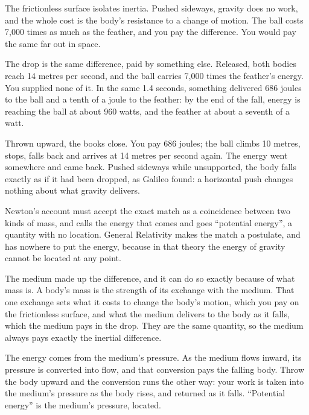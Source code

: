 \documentclass[11pt,a4paper]{article}
\begin{document}
The frictionless surface isolates inertia. Pushed sideways, gravity does no work, and the whole cost is the body's resistance to a change of motion. The ball costs 7{,}000 times as much as the feather, and you pay the difference. You would pay the same far out in space.

The drop is the same difference, paid by something else. Released, both bodies reach 14 metres per second, and the ball carries 7{,}000 times the feather's energy. You supplied none of it. In the same 1.4 seconds, something delivered 686 joules to the ball and a tenth of a joule to the feather: by the end of the fall, energy is reaching the ball at about 960 watts, and the feather at about a seventh of a watt. 

Thrown upward, the books close. You pay 686 joules; the ball climbs 10 metres, stops, falls back and arrives at 14 metres per second again. The energy went somewhere and came back. Pushed sideways while unsupported, the body falls exactly as if it had been dropped, as Galileo found: a horizontal push changes nothing about what gravity delivers.

Newton's account must accept the exact match as a coincidence between two kinds of mass, and calls the energy that comes and goes ``potential energy'', a quantity with no location. General Relativity makes the match a postulate, and has nowhere to put the energy, because in that theory the energy of gravity cannot be located at any point. 

\begin{hypbar}
The medium made up the difference, and it can do so exactly because of what mass is. A body's mass is the strength of its exchange with the medium. That one exchange sets what it costs to change the body's motion, which you pay on the frictionless surface, and what the medium delivers to the body as it falls, which the medium pays in the drop. They are the same quantity, so the medium always pays exactly the inertial difference.

The energy comes from the medium's pressure. As the medium flows inward, its pressure is converted into flow, and that conversion pays the falling body. Throw the body upward and the conversion runs the other way: your work is taken into the medium's pressure as the body rises, and returned as it falls. ``Potential energy'' is the medium's pressure, located.
\end{hypbar}
\end{document}
